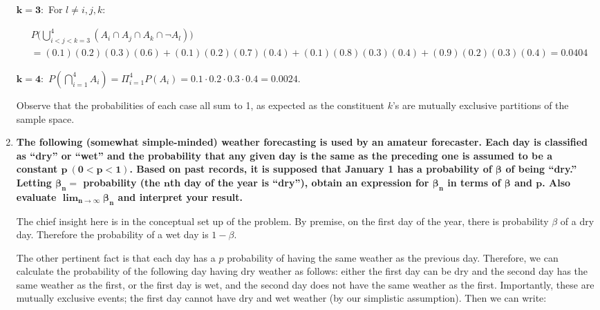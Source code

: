\documentclass[10pt, oneside]{article}   	%
\theoremstyle{definition}
\begin{document}
\begin{enumerate}[label=3.\arabic*]
$\bm{k = 3}:$ For $l \neq i, j, k$:

\begin{align*}
&P\Bigg( \bigcup^4_{i < j < k = 3} (A_i \cap A_j \cap A_k \cap \neg A_l) \Bigg) \\
&= (0.1)(0.2)(0.3)(0.6) + (0.1)(0.2)(0.7)(0.4) + (0.1)(0.8)(0.3)(0.4) + (0.9)(0.2)(0.3)(0.4) = \boxed{0.0404}
\end{align*}

$\bm{k = 4}:$ $P(\bigcap^4_{i=1} A_i) = \Pi^4_{i = 1} P(A_i) = 0.1 \cdot 0.2 \cdot 0.3 \cdot 0.4 = \boxed{0.0024}$.

Observe that the probabilities of each case all sum to 1, as expected as the constituent $k$'s are mutually exclusive partitions of the sample space.

\item  \begin{tcolorbox}[
  colback=Cerulean!5!white,
  colframe=Cerulean!75!black]
\textbf{The following (somewhat simple-minded) weather forecasting is used by an amateur forecaster. Each day is classified as ``dry'' or ``wet'' and the probability that any given day is the same as the preceding one is assumed to be a constant $\bm{p \ (0 < p < 1)}$. Based on past records, it is supposed that January 1 has a probability of $\bm{\beta}$ of being ``dry.'' Letting $\bm{\beta_n =}$ probability (the $\bm{n}$th day of the year is ``dry''), obtain an expression for $\bm{\beta_n}$ in terms of $\bm{\beta}$ and $\bm{p}$. Also evaluate $\bm{\lim_{n \rightarrow \infty} \beta_n}$ and interpret your result.}
\end{tcolorbox}

The chief insight here is in the conceptual set up of the problem. By premise, on the first day of the year, there is probability $\beta$ of a dry day. Therefore the probability of a wet day is $1 - \beta$. 

The other pertinent fact is that each day has a $p$ probability of having the same weather as the previous day. Therefore, we can calculate the probability of the following day having dry weather as follows: either the first day can be dry and the second day has the same weather as the first, or the first day is wet, and the second day does not have the same weather as the first. Importantly, these are mutually exclusive events; the first day cannot have dry and wet weather (by our simplistic assumption). Then we can write:


\end{enumerate}
\end{document}
